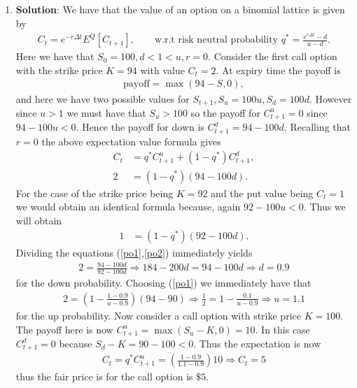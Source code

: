 \documentclass[10pt,english]{article}
\theoremstyle{plain}
\begin{document}
\begin{enumerate}
\item \textbf{Solution}: We have that the value of an option on a binomial lattice is given by
\begin{align*}
C_{t} = e^{-r\Delta t}E^{Q}[C_{t+1}], \qquad \text{w.r.t risk neutral probability } q^{*}=\frac{e^{r\Delta t}-d}{u-d}.
\end{align*}
Here we have that $S_{0}=100, d<1<u, r=0$. Consider the first call option with the strike price $K=94$ with value $C_{t}=2$. At expiry time the payoff is
\begin{align*}
\text{payoff}=\max(94-S,0),
\end{align*}
and here we have two possible values for $S_{t+1}, S_{u}=100u, S_{d}=100d$. However since $u>1$ we must have that $S_{u}>100$ so the payoff for $C_{t+1}^{u}=0$ since $94-100u < 0$. Hence the payoff for down is $C_{t+1}^{d}=94-100d$. Recalling that $r=0$ the above expectation value formula gives
\begin{align}
C_{t} &= q^{*}C_{t+1}^{u} + (1-q^{*})C_{t+1}^{d},\nonumber\\
2 &= (1-q^{*})(94-100d).\label{po1}
\end{align}
For the case of the strike price being $K=92$ and the put value being $C_{t}=1$ we would obtain an identical formula because, again $92-100u<0$. Thus we will obtain
\begin{align}
1 &= (1-q^{*})(92-100d).\label{po2}
\end{align}
Dividing the equations (\ref{po1},\ref{po2}) immediately yields
\begin{align}
2 = \frac{94-100d}{92-100d} \Rightarrow 184 - 200d = 94-100d \Rightarrow \boxed{d=0.9}
\end{align}
for the down probability.  Choosing (\ref{po1}) we immediately have that
\begin{align}
2 = \left(1-\frac{1-0.9}{u-0.9}\right)(94-90) \Rightarrow \frac{1}{2}=1-\frac{0.1}{u-0.9}\Rightarrow \boxed{u=1.1}
\end{align}
for the up probability. Now consider a call option with strike price $K=100$. The payoff here is now $C_{t+1}^{u}=\max(S_{u}-K,0)=10$. In this case $C_{t+1}^{d}=0$ because $S_{d}-K=90-100<0$. Thus the expectation is now
\begin{align}
C_{t} = q^{*}C^{u}_{t+1} = \left(\frac{1-0.9}{1.1-0.9}\right)10 \Rightarrow \boxed{C_{t}=5}
\end{align}
thus the fair price is for the call option is $\$5$.


\end{enumerate}
\end{document}

